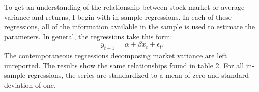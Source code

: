 To get an understanding of the relationship between stock market or average variance and returns, I begin with in-sample regressions. In each of these regressions, all of the information available in the sample is used to estimate the parameters. In general, the regressions take this form: 
\begin{equation}
	y_{t+1} = \alpha + \beta x_{t} + \epsilon_{t}.
\end{equation}
The contemporaneous regressions decomposing market variance are left unreported. The results show the same relationships found in  \citet{pollet_average_2010} table 2. For all in-sample regressions, the series are standardized to a mean of zero and standard deviation of one.

